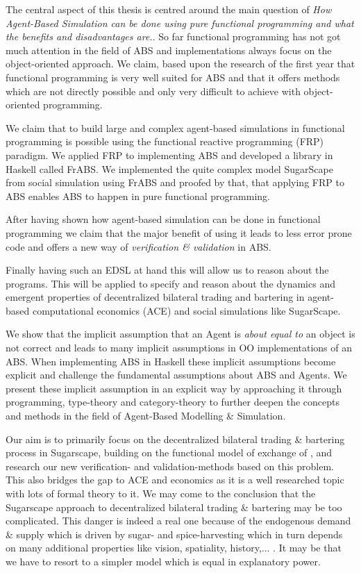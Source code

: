 The central aspect of this thesis is centred around the main question of \textit{How Agent-Based Simulation can be done using pure functional programming and what the benefits and disadvantages are.}. So far functional programming has not got much attention in the field of ABS and implementations always focus on the object-oriented approach. We claim, based upon the research of the first year that functional programming is very well suited for ABS and that it offers methods which are not directly possible and only very difficult to achieve with object-oriented programming. 

We claim that to build large and complex agent-based simulations in functional programming is possible using the functional reactive programming (FRP) paradigm. We applied FRP to implementing ABS and developed a library in Haskell called FrABS. We implemented the quite complex model SugarScape from social simulation using FrABS and proofed by that, that applying FRP to ABS enables ABS to happen in pure functional programming.

After having shown how agent-based simulation can be done in functional programming we claim that the major benefit of using it leads to less error prone code and offers a new way of \textit{verification \& validation} in ABS. 

Finally having such an EDSL at hand this will allow us to reason about the programs. This will be applied to specify and reason about the dynamics and emergent properties of decentralized bilateral trading and bartering in agent-based computational economics (ACE) and social simulations like SugarScape.

We show that the implicit assumption that an Agent is \textit{about equal to} an object is not correct and leads to many implicit assumptions in OO implementations of an ABS. When implementing ABS in Haskell these implicit assumptions become explicit and challenge the fundamental assumptions about ABS and Agents. We present these implicit assumption in an explicit way by approaching it through programming, type-theory and category-theory to further deepen the concepts and methods in the field of Agent-Based Modelling \& Simulation.

Our aim is to primarily focus on the decentralized bilateral trading \& bartering process in Sugarscape, building on the functional model of exchange of \cite{botta_functional_2011}, and research our new verification- and validation-methods based on this problem. This also bridges the gap to ACE and economics as it is a well researched topic with lots of formal theory to it. We may come to the conclusion that the Sugarscape approach to decentralized bilateral trading \& bartering may be too complicated. This danger is indeed a real one because of the endogenous demand \& supply which is driven by sugar- and spice-harvesting which in turn depends on many additional properties like vision, spatiality, history,... . It may be that we have to resort to a simpler model which is equal in explanatory power.

